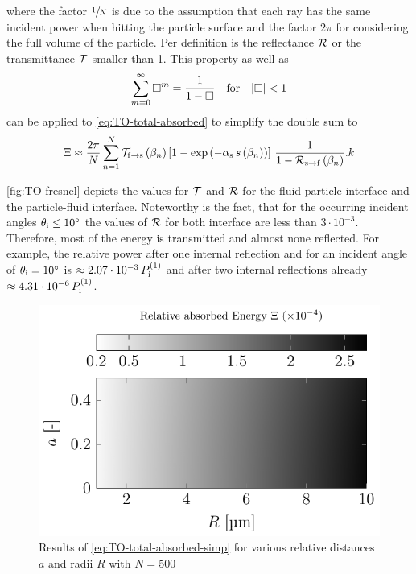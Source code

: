 where the factor $\sfrac{1}{N}$ is due to the assumption that each ray has the 
same incident power when hitting the particle surface and the factor $2\pi$ for 
considering the full volume of the particle. Per definition is the reflectance 
$\mathcal{R}$ or the transmittance $\mathcal{T}$ smaller than 1. This property as 
well as
\begin{equation}
  \sum\limits^{\infty}_{m=0} \Box^{m} = \frac{1}{1-\Box}
  \quad\text{for}\quad\abs{\Box} < 1
\end{equation}
can be applied to \cref{eq:TO-total-absorbed} to simplify the double sum to
\begin{equation}
  \Xi \approx
  \frac{2\pi}{N}
  \sum\limits_{n=1}^{N}
  \mathcal{T}_{\mathrm{f}\rightarrow\mathrm{s}}\left( \beta_{n} \right)
  \left[ 1 - \exp\left( -\alpha_{\mathrm{s}}\,s\left( \beta_{n} \right) \right) 
  \right]
  \,\frac{1}{1-\mathcal{R}_{\mathrm{s}\rightarrow\mathrm{f}}\left( \beta_{n} \right)}.
  \label{eq:TO-total-absorbed-simp}k
\end{equation}

\cref{fig:TO-fresnel} depicts the values for $\mathcal{T}$ and $\mathcal{R}$ for 
the fluid-particle interface and the particle-fluid interface. Noteworthy is 
the fact, that for the occurring incident angles $\theta_{\mathrm{i}} \leq 
\SI{10}{\degree}$ the values of $\mathcal{R}$ for both interface are less than 
$3\cdot 10^{-3}$. Therefore, most of the energy is transmitted and almost none 
reflected. For example, the relative power after one internal reflection and 
for an incident angle of $\theta_{\mathrm{i}}=\SI{10}{\degree}$ is $\approx 2.07\cdot 
10^{-3}\,P_{\mathrm{i}}^{(1)}$ and after two internal reflections already $\approx 
4.31\cdot 10^{-6}\,P_{\mathrm{i}}^{(1)}$.

\begin{figure}[tbp]
  \centering
  \includegraphics[]{Plots/cache/absorbed_energies.pdf}
  \caption{Results of \cref{eq:TO-total-absorbed-simp} for various relative 
  distances $a$ and radii $R$ with $N=500$ }
  \label{fig:TO-absorbed_energies}
\end{figure}

